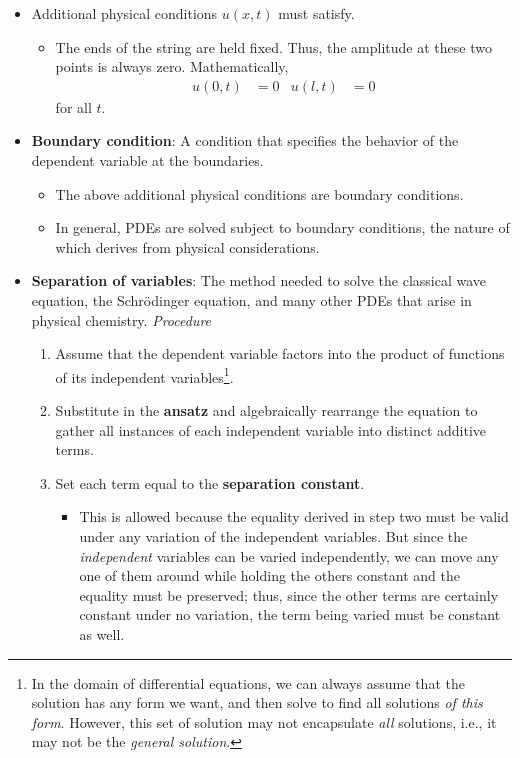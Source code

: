 \documentclass[../notes.tex]{subfiles}
\begin{document}
\begin{itemize}
    \item Additional physical conditions $u(x,t)$ must satisfy.
    \begin{itemize}
        \item The ends of the string are held fixed. Thus, the amplitude at these two points is always zero. Mathematically,
        \begin{align*}
            u(0,t) &= 0&
            u(l,t) &= 0
        \end{align*}
        for all $t$.
    \end{itemize}
    \item \textbf{Boundary condition}: A condition that specifies the behavior of the dependent variable at the boundaries.
    \begin{itemize}
        \item The above additional physical conditions are boundary conditions.
        \item In general, PDEs are solved subject to boundary conditions, the nature of which derives from physical considerations.
    \end{itemize}
    \item \textbf{Separation of variables}: The method needed to solve the classical wave equation, the Schr\"{o}dinger equation, and many other PDEs that arise in physical chemistry. \emph{Procedure}
    \begin{enumerate}
        \item Assume that the dependent variable factors into the product of functions of its independent variables\footnote{In the domain of differential equations, we can always assume that the solution has any form we want, and then solve to find all solutions \emph{of this form}. However, this set of solution may not encapsulate \emph{all} solutions, i.e., it may not be the \emph{general solution}.}.
        \item Substitute in the \textbf{ansatz} and algebraically rearrange the equation to gather all instances of each independent variable into distinct additive terms.
        \item Set each term equal to the \textbf{separation constant}.
        \begin{itemize}
            \item This is allowed because the equality derived in step two must be valid under any variation of the independent variables. But since the \emph{independent} variables can be varied independently, we can move any one of them around while holding the others constant and the equality must be preserved; thus, since the other terms are certainly constant under no variation, the term being varied must be constant as well.

\end{itemize}
\end{enumerate}
\end{itemize}
\end{document}
